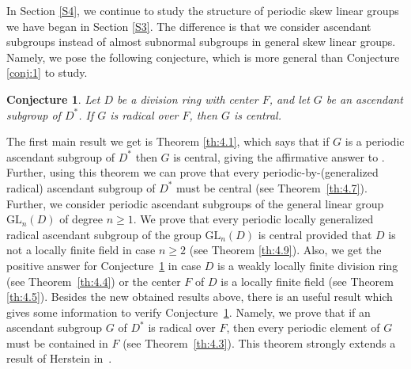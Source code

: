 \documentclass{amsart}
\newtheorem{conjecture}{Conjecture}
\theoremstyle{definition}
\begin{document}
    In Section \ref{S4}, we continue to study the structure of periodic skew linear groups we have began in Section \ref{S3}. The difference is that we consider ascendant subgroups instead of almost subnormal subgroups in general skew linear groups. Namely, we pose the following conjecture, which is more general than Conjecture \ref{conj:1} to study.
    \begin{conjecture}\label{conj:2}
    	Let $D$ be a division ring with center $F$, and let $G$ be an ascendant subgroup of $D^*$. If $G$ is radical over $F$, then $G$ is central.
    \end{conjecture}
	
The first main result we get is Theorem \ref{th:4.1}, which says that if $G$ is a periodic ascendant subgroup of $D^*$ then $G$ is central, giving the affirmative answer to \cite[Question 1]{Pa_ChuaHai_2026}. Further, using this theorem we can prove that every periodic-by-(generalized radical) ascendant subgroup of $D^*$ must be central (see Theorem~\ref{th:4.7}). Further, we consider periodic ascendant subgroups of the general linear group $\mathrm{GL}_n(D)$ of degree $n\ge 1$. We prove that every periodic locally generalized radical ascendant subgroup of the group $\mathrm{GL}_n(D)$ is central provided that $D$ is not a locally finite field in case $n\ge 2$ (see Theorem \ref{th:4.9}). Also, we get the positive answer for Conjecture~\ref{conj:2} in case $D$ is a weakly locally finite division ring (see Theorem~\ref{th:4.4}) or the center $F$ of $D$ is a locally finite field (see Theorem~ \ref{th:4.5}). Besides the new obtained results above, there is an useful  result which gives some information to verify Conjecture~\ref{conj:2}. Namely, we prove  that if an ascendant subgroup $G$ of $D^*$ is radical over $F$, then every periodic element of $G$ must be contained in $F$ (see Theorem~\ref{th:4.3}). This theorem strongly extends a result of Herstein in~\cite[Theorem~ 9]{Pa_Herstein_1978}.
\end{document}
